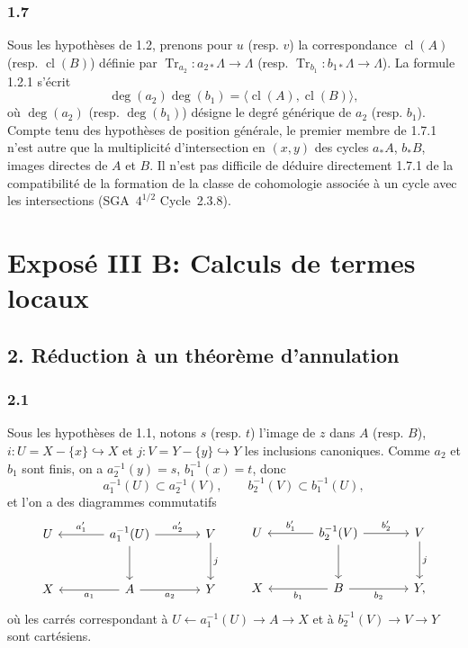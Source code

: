 \documentclass[11pt]{article}
\providecommand{\cl}{\operatorname{cl}}
\providecommand{\Tr}{\operatorname{Tr}}
\providecommand{\Tr}{\operatorname{Tr}}
\providecommand{\Tr}{\operatorname{Tr}}
\providecommand{\Tr}{\operatorname{Tr}}
\providecommand{\cl}{\operatorname{cl}}
\providecommand{\cl}{\operatorname{cl}}
\providecommand{\Tr}{\operatorname{Tr}}
\begin{document}
\subsubsection*{1.7}
Sous les hypothèses de 1.2, prenons pour $u$ (resp. $v$) la correspondance $\cl(A)$ (resp. $\cl(B)$) définie par $\Tr_{a_2}:a_{2*}\Lambda\to\Lambda$ (resp. $\Tr_{b_1}:b_{1*}\Lambda\to\Lambda$). La formule 1.2.1 s'écrit
\begin{equation}\tag{1.7.1}
\deg(a_2)\deg(b_1)=\langle \cl(A),\cl(B)\rangle,
\end{equation}
où $\deg(a_2)$ (resp. $\deg(b_1)$) désigne le degré générique de $a_2$ (resp. $b_1$). Compte tenu des hypothèses de position générale, le premier membre de 1.7.1 n'est autre que la multiplicité d'intersection en $(x,y)$ des cycles $a_*A$, $b_*B$, images directes de $A$ et $B$. Il n'est pas difficile de déduire directement 1.7.1 de la compatibilité de la formation de la classe de cohomologie associée à un cycle avec les intersections (SGA~$4^{1/2}$ Cycle~2.3.8).


\section*{Exposé III B: Calculs de termes locaux}

\subsection*{2. Réduction à un théorème d'annulation}

\subsubsection*{2.1}
Sous les hypothèses de 1.1, notons $s$ (resp. $t$) l'image de $z$ dans $A$ (resp. $B$), $i:U=X-\{x\}\hookrightarrow X$ et $j:V=Y-\{y\}\hookrightarrow Y$ les inclusions canoniques. Comme $a_2$ et $b_1$ sont finis, on a $a_2^{-1}(y)=s$, $b_1^{-1}(x)=t$, donc
\[
a_1^{-1}(U)\subset a_2^{-1}(V),\qquad b_2^{-1}(V)\subset b_1^{-1}(U),
\]
et l'on a des diagrammes commutatifs
\[
\begin{tikzcd}[column sep=large,row sep=large]
U & a_1^{-1}(U) \arrow[l,"a'_1"'] \arrow[r,"a'_2"] \arrow[d] & V \arrow[d,"j"]\\
X & A \arrow[l,"a_1"] \arrow[r,"a_2"'] & Y
\end{tikzcd}
\qquad
\begin{tikzcd}[column sep=large,row sep=large]
U & b_2^{-1}(V) \arrow[l,"b'_1"'] \arrow[r,"b'_2"] \arrow[d] & V \arrow[d,"j"]\\
X & B \arrow[l,"b_1"] \arrow[r,"b_2"'] & Y ,
\end{tikzcd}
\]
où les carrés correspondant à $U\leftarrow a_1^{-1}(U)\to A\to X$ et à $b_2^{-1}(V)\to V\to Y$ sont cartésiens.
\end{document}
